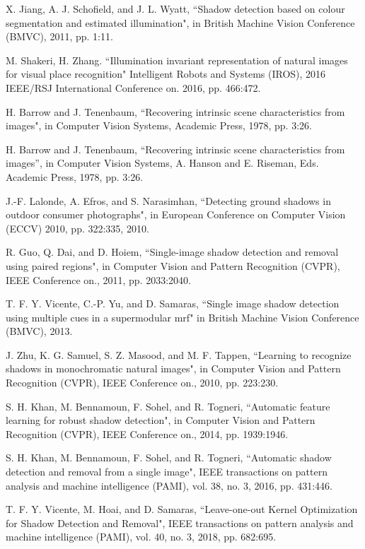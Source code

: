 \documentclass[letterpaper, 10 pt, conference]{ieeeconf}
\begin{document}
\begin{thebibliography}{99}
 X. Jiang, A. J. Schofield, and J. L. Wyatt, ``Shadow detection based
on colour segmentation and estimated illumination", in British Machine Vision Conference (BMVC), 2011,
pp. 1:11.

 M. Shakeri, H. Zhang. ``Illumination invariant representation of natural images for visual place recognition" Intelligent Robots and Systems (IROS), 2016 IEEE/RSJ International Conference on. 2016, pp. 466:472.

 H. Barrow and J. Tenenbaum, ``Recovering intrinsic scene characteristics
from images", in Computer Vision Systems, Academic Press, 1978, pp. 3:26.

 H. Barrow and J. Tenenbaum, ``Recovering intrinsic scene characteristics
from images'', in Computer Vision Systems, A. Hanson and E.
Riseman, Eds. Academic Press, 1978, pp. 3:26.

 J.-F. Lalonde, A. Efros, and S. Narasimhan, ``Detecting ground shadows
in outdoor consumer photographs", in European Conference on Computer Vision (ECCV) 2010, pp. 322:335, 2010.

 R. Guo, Q. Dai, and D. Hoiem, ``Single-image shadow detection and removal using paired regions", in Computer Vision and Pattern Recognition (CVPR), IEEE Conference on., 2011, pp.
2033:2040.

 T. F. Y. Vicente, C.-P. Yu, and D. Samaras, ``Single image shadow detection using multiple cues in a supermodular mrf" in British Machine Vision Conference (BMVC), 2013.

 J. Zhu, K. G. Samuel, S. Z. Masood, and M. F. Tappen, ``Learning to
recognize shadows in monochromatic natural images", in Computer
Vision and Pattern Recognition (CVPR), IEEE Conference on., 2010, pp. 223:230.

 S. H. Khan, M. Bennamoun, F. Sohel, and R. Togneri, ``Automatic
feature learning for robust shadow detection", in Computer Vision and
Pattern Recognition (CVPR), IEEE Conference on., 2014, pp. 1939:1946.

 S. H. Khan, M. Bennamoun, F. Sohel, and R. Togneri, ``Automatic shadow detection and removal from a single image", IEEE transactions on pattern
analysis and machine intelligence (PAMI), vol. 38, no. 3, 2016, pp. 431:446.

 T. F. Y. Vicente, M. Hoai, and D. Samaras, ``Leave-one-out Kernel Optimization for Shadow Detection and Removal", IEEE transactions on pattern
analysis and machine intelligence (PAMI), vol. 40, no. 3, 2018, pp. 682:695.


\end{thebibliography}
\end{document}

